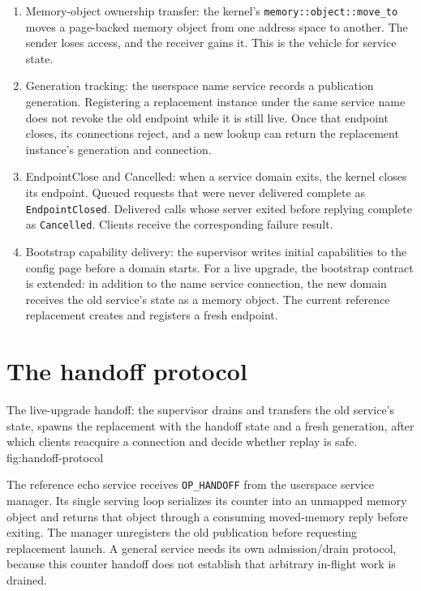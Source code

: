 \begin{enumerate}
    \item Memory-object ownership transfer: the kernel's
        \texttt{memory::object::move\_to} moves a page-backed memory object
        from one address space to another. The sender loses access, and the
        receiver gains it. This is the vehicle for service state.

    \item Generation tracking: the userspace name service records a
        publication generation. Registering a replacement instance under the same
        service name does not revoke the old endpoint while it is still live.
        Once that endpoint closes, its connections reject, and a new lookup can
        return the replacement instance's generation and connection.

    \item EndpointClose and Cancelled: when a service domain exits,
        the kernel closes its endpoint. Queued requests that were never
        delivered complete as \texttt{EndpointClosed}. Delivered calls whose
        server exited before replying complete as \texttt{Cancelled}. Clients
        receive the corresponding failure result.

    \item Bootstrap capability delivery: the supervisor writes
        initial capabilities to the config page before a domain starts. For a
        live upgrade, the bootstrap contract is extended: in addition to the
        name service connection, the new domain receives the old service's
        state as a memory object. The current reference replacement creates and
        registers a fresh endpoint.
\end{enumerate}

\section{The handoff protocol}

    {The live-upgrade handoff: the supervisor drains and transfers the old
    service's state, spawns the replacement with the handoff state and a fresh
    generation, after which clients reacquire a connection and decide whether replay is safe.}
    {fig:handoff-protocol}

The reference echo service receives \texttt{OP\_HANDOFF} from the userspace
service manager. Its single serving loop serializes its counter into an unmapped
memory object and returns that object through a consuming moved-memory reply
before exiting. The manager unregisters the old publication before requesting
replacement launch. A general service needs its own admission/drain protocol, because
this counter handoff does not establish that arbitrary in-flight work is drained.

